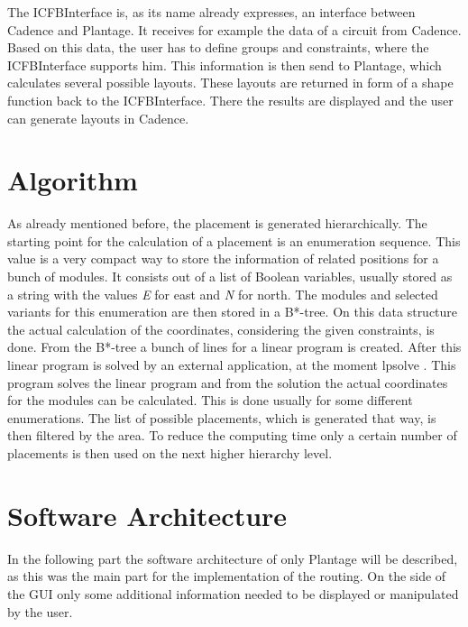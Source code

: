 The ICFBInterface is, as its name already expresses, an interface between Cadence and Plantage. It receives for example the data of a circuit from Cadence. Based on this data, the user has to define groups and constraints, where the ICFBInterface supports him. This information is then send to Plantage, which calculates several possible layouts. These layouts are returned in form of a shape function back to the ICFBInterface. There the results are displayed and the user can generate layouts in Cadence.

\section{Algorithm}
As already mentioned before, the placement is generated hierarchically. The starting point for the calculation of a placement is an enumeration sequence. This value is a very compact way to store the information of related positions for a bunch of modules. It consists out of a list of Boolean variables, usually stored as a string with the values \textit{E} for east and \textit{N} for north. The modules and selected variants for this enumeration are then stored in a B*-tree. On this data structure the actual calculation of the coordinates, considering the given constraints, is done. From the B*-tree a bunch of lines for a linear program is created. After this linear program is solved by an external application, at the moment lp\textunderscore solve \cite{lp_solve}. This program solves the linear program and from the solution the actual coordinates for the modules can be calculated. This is done usually for some different enumerations. The list of possible placements, which is generated that way, is then filtered by the area. To reduce the computing time only a certain number of placements is then used on the next higher hierarchy level.

\section{Software Architecture}
In the following part the software architecture of only Plantage will be described, as this was the main part for the implementation of the routing. On the side of the GUI only some additional information needed to be displayed or manipulated by the user.

